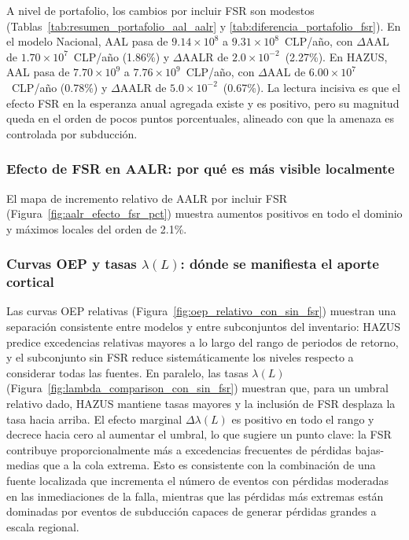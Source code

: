 A nivel de portafolio, los cambios \pFifty{} por incluir FSR son modestos (Tablas~\ref{tab:resumen_portafolio_aal_aalr} y \ref{tab:diferencia_portafolio_fsr}). En el modelo Nacional, AAL \pFifty{} pasa de $9.14\times10^{8}$ a $9.31\times10^{8}$~CLP/año, con $\Delta$AAL de $1.70\times10^{7}$~CLP/año (1.86\%) y $\Delta$AALR de $2.0\times10^{-2}$\textperthousand\ (2.27\%). En HAZUS, AAL \pFifty{} pasa de $7.70\times10^{9}$ a $7.76\times10^{9}$~CLP/año, con $\Delta$AAL de $6.00\times10^{7}$~CLP/año (0.78\%) y $\Delta$AALR de $5.0\times10^{-2}$\textperthousand\ (0.67\%). La lectura incisiva es que el efecto FSR en la esperanza anual agregada existe y es positivo, pero su magnitud queda en el orden de pocos puntos porcentuales, alineado con que la amenaza es controlada por subducción.

\subsubsection{Efecto de FSR en AALR: por qué es más visible localmente}
\label{subsubsec:disc_efecto_fsr_aalr}

El mapa de incremento relativo de AALR por incluir FSR (Figura~\ref{fig:aalr_efecto_fsr_pct}) muestra aumentos positivos en todo el dominio y máximos locales del orden de 2.1\%.


\subsubsection{\texorpdfstring{Curvas OEP y tasas $\lambda(L)$: dónde se manifiesta el aporte cortical}{Curvas OEP y tasas lambda(L): donde se manifiesta el aporte cortical}}
\label{subsubsec:disc_oep_lambda}

Las curvas OEP relativas (Figura~\ref{fig:oep_relativo_con_sin_fsr}) muestran una separación consistente entre modelos y entre subconjuntos del inventario: HAZUS predice excedencias relativas mayores a lo largo del rango de periodos de retorno, y el subconjunto sin FSR reduce sistemáticamente los niveles respecto a considerar todas las fuentes. En paralelo, las tasas $\lambda(L)$ (Figura~\ref{fig:lambda_comparison_con_sin_fsr}) muestran que, para un umbral relativo dado, HAZUS mantiene tasas mayores y la inclusión de FSR desplaza la tasa hacia arriba. El efecto marginal $\Delta\lambda(L)$ es positivo en todo el rango y decrece hacia cero al aumentar el umbral, lo que sugiere un punto clave: la FSR contribuye proporcionalmente más a excedencias frecuentes de pérdidas bajas-medias que a la cola extrema. Esto es consistente con la combinación de una fuente localizada que incrementa el número de eventos con pérdidas moderadas en las inmediaciones de la falla, mientras que las pérdidas más extremas están dominadas por eventos de subducción capaces de generar pérdidas grandes a escala regional.


